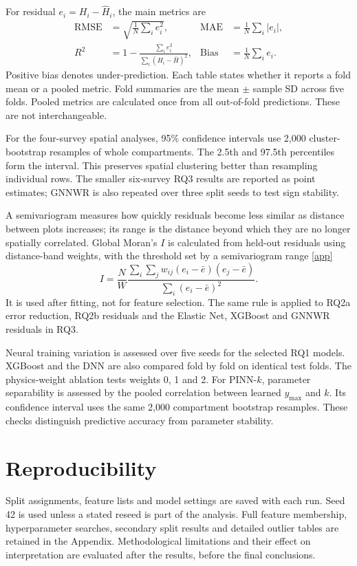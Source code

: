 For residual $e_i=H_i-\hat H_i$, the main metrics are
\begin{align}
\mathrm{RMSE}&=\sqrt{\frac{1}{N}\sum_i e_i^2}, &
\mathrm{MAE}&=\frac{1}{N}\sum_i|e_i|, \\
R^2&=1-\frac{\sum_i e_i^2}{\sum_i(H_i-\bar H)^2}, &
\mathrm{Bias}&=\frac{1}{N}\sum_i e_i.
\end{align}
Positive bias denotes under-prediction. Each table states whether it reports a fold mean or a
pooled metric. Fold summaries are the mean $\pm$ sample SD across five folds. Pooled metrics are
calculated once from all out-of-fold predictions. These are not interchangeable.

For the four-survey spatial analyses, 95\% confidence intervals use 2,000 cluster-bootstrap
resamples of whole compartments. The 2.5th and 97.5th percentiles form the interval. This preserves
spatial clustering better than resampling individual rows. The smaller six-survey RQ3 results are
reported as point estimates; GNNWR is also repeated over three split seeds to test sign stability.

A semivariogram measures how quickly residuals become less similar as distance between plots increases; its range is the distance beyond which they are no longer spatially correlated.
Global Moran's $I$ is calculated from held-out residuals using distance-band weights, with the threshold set by a semivariogram range \ref{app}
\begin{equation}
I=\frac{N}{W}
\frac{\sum_i\sum_j w_{ij}(e_i-\bar e)(e_j-\bar e)}
{\sum_i(e_i-\bar e)^2}.
\label{eq:morans-i}
\end{equation}
It is used after fitting, not for feature selection. The same rule is applied to RQ2a error
reduction, RQ2b residuals and the Elastic Net, XGBoost and GNNWR residuals in RQ3.

Neural training variation is assessed over five seeds for the selected RQ1 models. XGBoost and the
DNN are also compared fold by fold on identical test folds. The physics-weight ablation tests
weights 0, 1 and 2. For PINN-$k$, parameter separability is assessed by the pooled correlation
between learned $y_{\max}$ and $k$. Its confidence interval uses the same 2,000 compartment
bootstrap resamples. These checks distinguish predictive accuracy from parameter stability.

\section{Reproducibility}

Split assignments, feature lists and model settings are saved with each run. Seed 42 is used unless
a stated reseed is part of the analysis. Full feature membership, hyperparameter searches,
secondary split results and detailed outlier tables are retained in the Appendix. Methodological
limitations and their effect on interpretation are evaluated after the results, before the final
conclusions.
